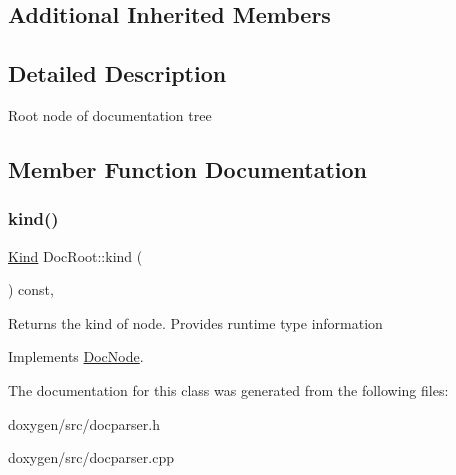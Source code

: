 \subsection*{Additional Inherited Members}


\subsection{Detailed Description}
Root node of documentation tree 

\subsection{Member Function Documentation}
\mbox{\label{class_doc_root_a10f6bf255986dbedb03f413827174276}} 
\subsubsection{\texorpdfstring{kind()}{kind()}}
{\footnotesize\ttfamily \mbox{\hyperlink{class_doc_node_aebd16e89ca590d84cbd40543ea5faadb}{Kind}} Doc\+Root\+::kind (\begin{DoxyParamCaption}{ }\end{DoxyParamCaption}) const\hspace{0.3cm}{\ttfamily [inline]}, {\ttfamily [virtual]}}

Returns the kind of node. Provides runtime type information 

Implements \mbox{\hyperlink{class_doc_node_a108ffd214a72ba6e93dac084a8f58049}{Doc\+Node}}.



The documentation for this class was generated from the following files\+:\begin{DoxyCompactItemize}
\item 
doxygen/src/docparser.\+h\item 
doxygen/src/docparser.\+cpp\end{DoxyCompactItemize}
